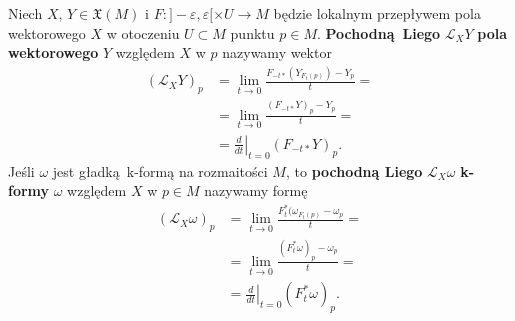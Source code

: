 Niech \(X,\,Y\in\mathfrak{X}(M)\) i \(F:]-\varepsilon, \varepsilon[\times U\rightarrow M\) będzie lokalnym przepływem pola wektorowego \(X\) w otoczeniu \(U\subset M\) punktu \(p\in M\). \textbf{Pochodną Liego} \(\mathcal{L}_X Y\) \textbf{pola wektorowego} \(Y\) względem \(X\) w \(p\) nazywamy wektor
\begin{equation}\label{eq:lie_vector}
\begin{split}
(\mathcal{L}_X Y)_p &= \lim_{t\to 0} \frac{F_{-t\ast}(Y_{F_t(p)})-Y_p}{t} =\\
                    &= \lim_{t\to 0} \frac{(F_{-t\ast}Y)_p - Y_p}{t} =\\
                    &= \left.\frac{d}{dt}\right|_{t = 0}(F_{-t\ast}Y)_p.
\end{split}
\end{equation} 
Jeśli \(\omega\) jest gładką k-formą na rozmaitości \(M\), to \textbf{pochodną Liego} \(\mathcal{L}_X \omega\) \textbf{k-formy} \(\omega\) względem \(X\) w \(p\in M\) nazywamy formę
\begin{equation}\label{eq:lie_form}
\begin{split}
(\mathcal{L}_X \omega)_p &= \lim_{t\to 0}\frac{F_t^{\ast}(\omega_{F_t(p)}-\omega_p}{t} =\\
						 &= \lim_{t\to 0}\frac{(F_t^{\ast}\omega)_p - \omega_p}{t} =\\
						 &= \left.\frac{d}{dt}\right|_{t=0}(F_t^{\ast}\omega)_p.
\end{split}
\end{equation}
